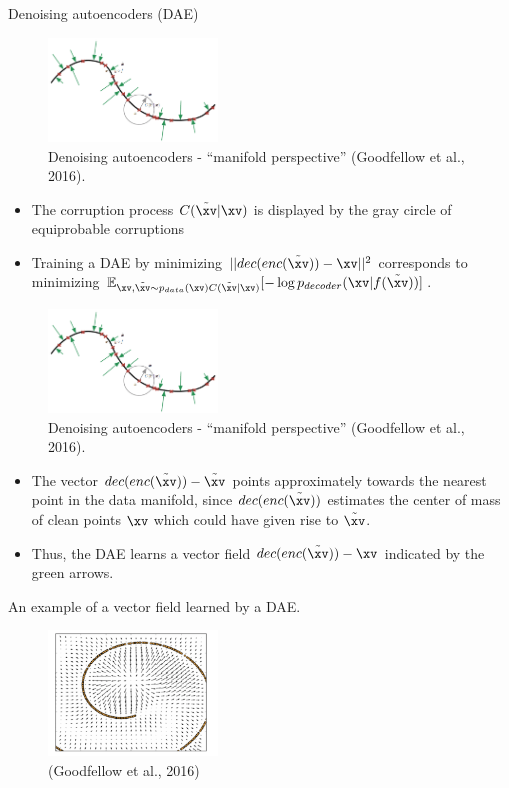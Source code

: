 \begin{vbframe}{Denoising autoencoders (DAE)}
\begin{figure}
    \includegraphics[width=4.5cm]{plots/denoising_autoencoder.png}
    \caption{Denoising autoencoders - \enquote{manifold perspective} (Goodfellow et al., 2016).}
  \end{figure}
  \begin{itemize}
    \item The corruption process $C(\tilde{\xv}|\xv)$ is displayed by the gray circle of equiprobable corruptions
    \item Training a DAE  by minimizing  $||dec(enc(\tilde{\xv})) - \xv||^2$ corresponds to minimizing $
    \mathbb{E}_{\xv,\tilde{\xv}\sim p_{data}(\xv)C(\tilde{\xv}|\xv)}[- \log p_{decoder}(\xv|f(\tilde{\xv}))]$.
  \end{itemize}
\framebreak
\begin{figure}
    \centering
    \includegraphics[width=4.5cm]{plots/denoising_autoencoder.png}
    \caption{Denoising autoencoders - \enquote{manifold perspective} (Goodfellow et al., 2016).}
  \end{figure}
  \begin{itemize}
 
    \item The vector $dec(enc(\tilde{\xv})) - \tilde{\xv}$ points approximately towards the nearest point in the  data manifold, since $dec(enc(\tilde{\xv}))$ estimates the center of mass of clean points $\xv$ which could have given rise to $\tilde{\xv}$.
    \item Thus, the DAE learns a vector field $dec(enc(\tilde\xv)) - \xv$ indicated by the green arrows.
  \end{itemize}
  
\framebreak

An example of a vector field learned by a DAE. 
  
  \begin{figure}
    \centering
    \includegraphics[width=4.5cm]{plots/DAE-vectorfield.png}
    \caption{(Goodfellow et al., 2016)}
  \end{figure}
  
  
\end{vbframe}

